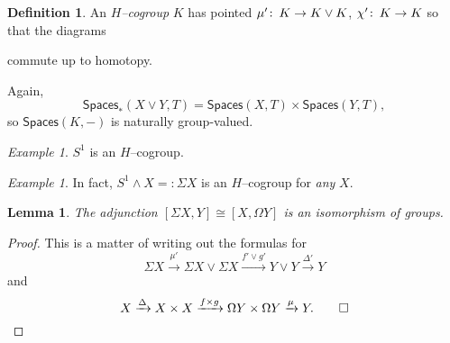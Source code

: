 \documentclass{amsart}
\newcommand{\CatOf}[1]{\mathsf{#1}}
\newcommand{\define}[1]{\textit{#1}}
\newcommand{\co}{\colon\thinspace}
\newcommand{\Loops}{\Omega}
\newcommand{\sm}{\wedge}
\newcommand{\Susp}{\Sigma}
\DeclareMathOperator{\id}{id}
\theoremstyle{plain}
\newtheorem{lemma}[dummy]{Lemma}
\theoremstyle{definition}
\newtheorem{definition}[dummy]{Definition}
\theoremstyle{remark}
\newtheorem{example}[dummy]{Example}
\begin{document}
\begin{definition}
An \define{$H$--cogroup} $K$ has pointed $\mu'\co K \to K \vee K$, $\chi'\co K \to K$ so that the diagrams
\begin{center}
\end{center}
commute up to homotopy.
\end{definition}

Again, \[\CatOf{Spaces}_*(X \vee Y, T) = \CatOf{Spaces}(X, T) \times \CatOf{Spaces}(Y, T),\] so $\CatOf{Spaces}(K, -)$ is naturally group-valued.

\begin{example}
$S^1$ is an $H$--cogroup.
\end{example}

\begin{example}
In fact, $S^1 \sm X =: \Susp X$ is an $H$--cogroup for \emph{any} $X$.
\end{example}

\begin{lemma}
The adjunction $[\Susp X, Y] \cong [X, \Loops Y]$ is an isomorphism of groups.
\end{lemma}
\begin{proof}
This is a matter of writing out the formulas for \[\Susp X \xrightarrow{\mu'} \Susp X \vee \Susp X \xrightarrow{f' \vee g'} Y \vee Y \xrightarrow{\Delta'} Y\] and \[X \xrightarrow\Delta X \times X \xrightarrow{f \times g} \Loops Y \times \Loops Y \xrightarrow\mu Y. \qed\]
\end{proof}
\end{document}
